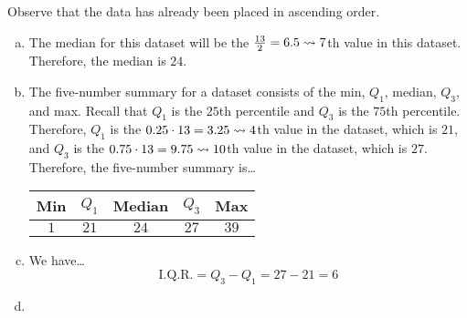 \documentclass[12pt,letterpaper]{exam}
\begin{document}
\begin{questions}
\sol Observe that the data has already been placed in ascending order. 
\begin{enumerate}[(a)]
\item The median for this dataset will be the $\frac{13}{2} = 6.5 \rightsquigarrow 7$th value in this dataset. Therefore, the median is $24$. \pspace

\item The five-number summary for a dataset consists of the min, $Q_1$, median, $Q_3$, and max. Recall that $Q_1$ is the $25$th percentile and $Q_3$ is the $75$th percentile. Therefore, $Q_1$ is the $0.25 \cdot 13= 3.25 \rightsquigarrow 4$th value in the dataset, which is $21$, and $Q_3$ is the $0.75 \cdot 13= 9.75 \rightsquigarrow 10$th value in the dataset, which is $27$. Therefore, the five-number summary is\dots
	\begin{table}[ht]
	\centering
	\begin{tabular}{ccccc}
	Min & $Q_1$ & Median & $Q_3$ & Max \\ \hline 
	$1$ & $21$ & $24$ & $27$ & $39$
	\end{tabular}
	\end{table} \par

\item We have\dots
	\[
	\text{I.Q.R.} = Q_3 - Q_1 = 27 - 21 = 6
	\] \pspace

\item \phantom{.} \par
	\begin{center}
\end{center}
\end{enumerate}
\end{questions}
\end{document}
